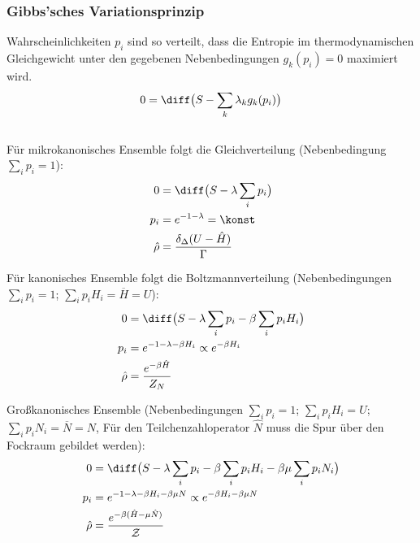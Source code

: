 \documentclass[11pt]{article}
\numberwithin{equation}{section}
\begin{document}
      \subsubsection{Gibbs'sches Variationsprinzip}
        Wahrscheinlichkeiten $p_i$ sind so verteilt, dass die Entropie im thermodynamischen Gleichgewicht unter den gegebenen Nebenbedingungen $g_k(p_i) = 0$ maximiert wird.
        \begin{equation}
          0 = \diff \big( S - \sum_k \lambda_k g_k(p_i) \big)
        \end{equation}\\

        Für mikrokanonisches Ensemble folgt die Gleichverteilung (Nebenbedingung $\sum_i p_i = 1$):
        \begin{equation}
          \begin{aligned}
            0 &= \diff \big( S - \lambda \sum_i p_i \big) \\
            p_i &= e^{-1-\lambda} = \konst \\
            \hat{\rho} &= \frac{\delta_\Delta(U-\hat{H})}{\Gamma} \\
          \end{aligned}
        \end{equation}

        Für kanonisches Ensemble folgt die Boltzmannverteilung (Nebenbedingungen $\sum_i p_i = 1$; $\sum_i p_i H_i = \overline{H} = U$):
        \begin{equation}
          \begin{aligned}
            0 &= \diff \big( S - \lambda \sum_i p_i - \beta \sum_i p_i H_i \big) \\
            p_i &= e^{-1-\lambda-\beta H_i} \propto e^{-\beta H_i} \\
            \hat{\rho} &= \frac{e^{-\beta \hat{H}}}{Z_N} \\
          \end{aligned}
        \end{equation}

        Großkanonisches Ensemble (Nebenbedingungen $\sum_i p_i = 1$; $\sum_i p_i H_i = U$; $\sum_i p_i N_i = \overline{N} = N$, Für den Teilchenzahloperator $\hat{N}$ muss die Spur über den Fockraum gebildet werden):
        \begin{equation}
          \begin{aligned}
            0 &= \diff \big( S - \lambda \sum_i p_i - \beta \sum_i p_i H_i - \beta\mu \sum_i p_i N_i \big) \\
            p_i &= e^{-1-\lambda-\beta H_i-\beta\mu N} \propto e^{-\beta H_i - \beta\mu N} \\
            \hat{\rho} &= \frac{e^{-\beta (\hat{H} - \mu \hat{N})}}{\mathcal{Z}} \\
          \end{aligned}
        \end{equation}
\end{document}
